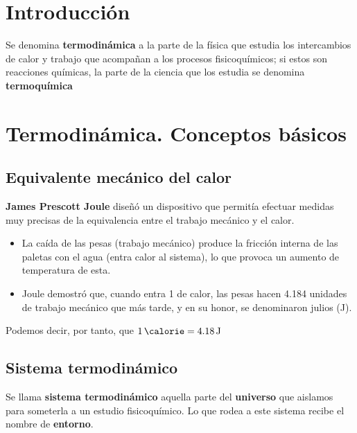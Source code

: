 

\section{Introducción}


\begin{definition}
    Se denomina \textbf{termodinámica} a la parte de la física que estudia los intercambios de calor y trabajo que acompañan a los procesos fisicoquímicos; si estos son reacciones químicas, la parte de la ciencia que los estudia se denomina \textbf{termoquímica}
\end{definition}


\section{Termodinámica. Conceptos básicos}\label{sec:termodinamica.-conceptos-basicos}

\subsection{Equivalente mecánico del calor}\label{subsec:equivalente-mecanico-del-calor}

\textbf{James Prescott Joule} diseñó un dispositivo que permitía efectuar medidas muy precisas de la equivalencia entre el trabajo mecánico y el calor.

\begin{itemize}
    \item La caída de las pesas (trabajo mecánico) produce la fricción interna de las paletas con el agua (entra calor al sistema), lo que provoca un aumento de temperatura de esta.
    \item Joule demostró que, cuando entra \SI{1}{\calorie} de calor, las pesas hacen \num{4.184} unidades de trabajo mecánico que más tarde, y en su honor, se denominaron julios (\unit{\joule}).
\end{itemize}

Podemos decir, por tanto, que \(\SI{1}{\calorie} = \SI{4.18}{\joule}\)

\subsection{Sistema termodinámico}\label{subsec:sistema-termodinamico}

Se llama \textbf{sistema termodinámico} aquella parte del \textbf{universo} que aislamos para someterla a un estudio fisicoquímico.
Lo que rodea a este sistema recibe el nombre de \textbf{entorno}.

